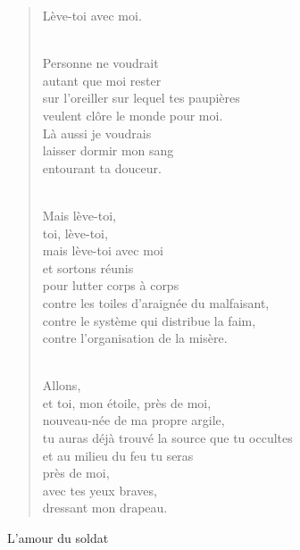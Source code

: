 \documentclass[11pt,a4paper]{book}
\begin{document}
\begin{verse}
Lève-toi avec moi. \\ \

Personne ne voudrait \\
autant que moi rester \\
sur l'oreiller sur lequel tes paupières \\
veulent clôre le monde pour moi. \\
Là aussi je voudrais \\
laisser dormir mon sang \\
entourant ta douceur. \\ \

Mais lève-toi, \\
toi, lève-toi, \\
mais lève-toi avec moi \\
et sortons réunis \\
pour lutter corps à corps \\
contre les toiles d'araignée du malfaisant, \\
contre le système qui distribue la faim, \\
contre l'organisation de la misère. \\ \

Allons, \\
et toi, mon étoile, près de moi, \\
nouveau-née de ma propre argile, \\
tu auras déjà trouvé la source que tu occultes \\
et au milieu du feu tu seras \\
près de moi, \\
avec tes yeux braves, \\
dressant mon drapeau.
\end{verse}

\newpage


{\huge L'amour du soldat} \\ \\
\end{document}
